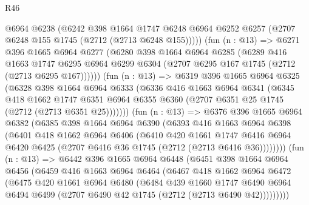 \begin{lexlean}{R46}
\begin{coremodule}
          @6964
          @6238
          (@6242
            @398
            @1664
            @1747
            @6248
            @6964
            @6252
            @6257
            (@2707 @6248 @155 @1745 (@2712 (@2713 @6248 @155)))))
        (fun (n : @13) =>
        @6271
          @396
          @1665
          @6964
          @6277
          (@6280
            @398
            @1664
            @6964
            @6285
            (@6289
              @416
              @1663
              @1747
              @6295
              @6964
              @6299
              @6304
              (@2707 @6295 @167 @1745 (@2712 (@2713 @6295 @167))))))
        (fun (n : @13) =>
        @6319
          @396
          @1665
          @6964
          @6325
          (@6328
            @398
            @1664
            @6964
            @6333
            (@6336
              @416
              @1663
              @6964
              @6341
              (@6345
                @418
                @1662
                @1747
                @6351
                @6964
                @6355
                @6360
                (@2707 @6351 @25 @1745 (@2712 (@2713 @6351 @25)))))))
        (fun (n : @13) =>
        @6376
          @396
          @1665
          @6964
          @6382
          (@6385
            @398
            @1664
            @6964
            @6390
            (@6393
              @416
              @1663
              @6964
              @6398
              (@6401
                @418
                @1662
                @6964
                @6406
                (@6410
                  @420
                  @1661
                  @1747
                  @6416
                  @6964
                  @6420
                  @6425
                  (@2707 @6416 @36 @1745 (@2712 (@2713 @6416 @36))))))))
        (fun (n : @13) =>
        @6442
          @396
          @1665
          @6964
          @6448
          (@6451
            @398
            @1664
            @6964
            @6456
            (@6459
              @416
              @1663
              @6964
              @6464
              (@6467
                @418
                @1662
                @6964
                @6472
                (@6475
                  @420
                  @1661
                  @6964
                  @6480
                  (@6484
                    @439
                    @1660
                    @1747
                    @6490
                    @6964
                    @6494
                    @6499
                    (@2707 @6490 @42 @1745 (@2712 (@2713 @6490 @42)))))))))

\end{coremodule}
\end{lexlean}

